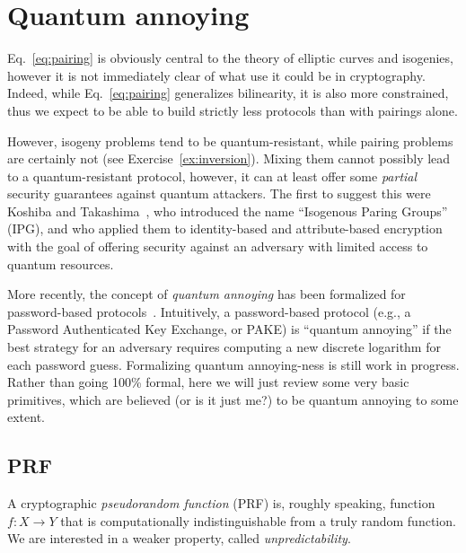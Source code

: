 \documentclass{article}
\begin{document}
\section{Quantum annoying}
\label{sec:quantum-annoying}

Eq.~\eqref{eq:pairing} is obviously central to the theory of elliptic
curves and isogenies, however it is not immediately clear of what use
it could be in cryptography.  Indeed, while Eq.~\eqref{eq:pairing}
generalizes bilinearity, it is also more constrained, thus we expect
to be able to build strictly less protocols than with pairings alone.

However, isogeny problems tend to be quantum-resistant, while pairing
problems are certainly not (see Exercise~\ref{ex:inversion}).  Mixing
them cannot possibly lead to a quantum-resistant protocol, however, it
can at least offer some \emph{partial} security guarantees against
quantum attackers.  The first to suggest this were Koshiba and
Takashima~\cite{EPRINT:KosTak16,ICISC:KosTak18}, who introduced the
name ``Isogenous Paring Groups'' (IPG), and who applied them to
identity-based and attribute-based encryption with the goal of
offering security against an adversary with limited access to quantum
resources.

More recently, the concept of \emph{quantum annoying} has been
formalized for password-based protocols~\cite{cryptoeprint:2021:696}.
Intuitively, a password-based protocol (e.g., a Password Authenticated
Key Exchange, or PAKE) is ``quantum annoying'' if the best strategy
for an adversary requires computing a new discrete logarithm for each
password guess. Formalizing quantum annoying-ness is still work in
progress. Rather than going 100\% formal, here we will just review
some very basic primitives, which are believed (or is it just me?) to
be quantum annoying to some extent.

\subsection{PRF}

A cryptographic \emph{pseudorandom function} (PRF) is, roughly
speaking, function $f:X\to Y$ that is computationally
indistinguishable from a truly random function.  We are interested in
a weaker property, called \emph{unpredictability}.
\end{document}

